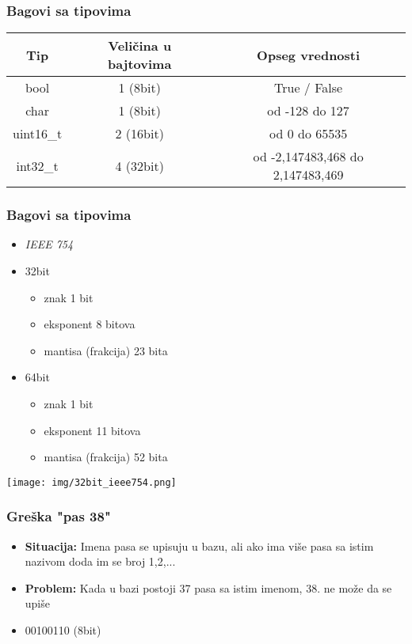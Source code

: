 \documentclass{beamer}
\begin{document}
\begin{frame}
    \frametitle{Bagovi sa tipovima}
    \begin{center}
        \begin{tabular}{ |c|c|c| }%
            \hline
            Tip & Veličina u bajtovima & Opseg vrednosti \\
            \hline
            bool & 1 (8bit) & True / False \\
            \hline
            char & 1 (8bit) & od -128 do 127 \\
            \hline
            uint16\_t & 2 (16bit) & od 0 do 65535 \\
            \hline
            int32\_t & 4 (32bit) & od -2,147483,468 do 2,147483,469 \\            
            \hline
        \end{tabular}
    \end{center}
\end{frame}

\begin{frame}
    \frametitle{Bagovi sa tipovima}
    
    \begin{itemize}
        \item \textit {IEEE 754} \newline
        \item 32bit
         \begin{itemize}
            \item znak 1 bit
            \item eksponent 8 bitova
            \item mantisa (frakcija) 23 bita
        \end{itemize}
        \item 64bit
         \begin{itemize}
            \item znak 1 bit
            \item eksponent 11 bitova
            \item mantisa (frakcija) 52 bita
        \end{itemize}
    \end{itemize}

    \begin{center}
        \texttt{[image: img/32bit\_ieee754.png]}
    \end{center}
\end{frame}

\begin{frame}
    \frametitle{Greška "pas 38"}
    \begin{itemize}
        \item \textbf{Situacija: } Imena pasa se upisuju u bazu, ali ako ima više pasa sa istim nazivom doda im se broj 1,2,... \newline
        \item \textbf{Problem: } Kada u bazi postoji 37 pasa sa istim imenom, 38. ne može da se upiše \newline
        \item 00100110 (8bit)
    \end{itemize}
\end{frame}
\end{document}
